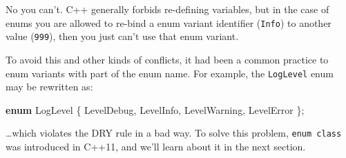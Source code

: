 \documentclass[
]{book}
\newenvironment{Shaded}{\begin{snugshade}}{\end{snugshade}}
\newcommand{\KeywordTok}[1]{\textcolor[rgb]{0.13,0.29,0.53}{\textbf{#1}}}
\newcommand{\NormalTok}[1]{#1}
\begin{document}
No you can't. C++ generally forbids re-defining variables, but in the case of
enums you are allowed to re-bind a enum variant identifier (\texttt{Info}) to another
value (\texttt{999}), then you just can't use that enum variant.

To avoid this and other kinds of conflicts, it had been a common practice to
enum variants with part of the enum name. For example, the \texttt{LogLevel} enum
may be rewritten as:

\begin{Shaded}
\begin{Highlighting}[]
\KeywordTok{enum}\NormalTok{ LogLevel}
\NormalTok{\{}
\NormalTok{    LevelDebug,}
\NormalTok{    LevelInfo,}
\NormalTok{    LevelWarning,}
\NormalTok{    LevelError}
\NormalTok{\};}
\end{Highlighting}
\end{Shaded}

\ldots which violates the DRY rule in a bad way. To solve this problem, \texttt{enum\ class} was introduced
in C++11, and we'll learn about it in the next section.

  
\end{document}
